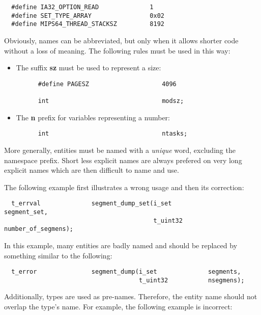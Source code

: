 \begin{verbatim}
  #define IA32_OPTION_READ              1
  #define SET_TYPE_ARRAY                0x02
  #define MIPS64_THREAD_STACKSZ         8192
\end{verbatim}

Obviously, names can be abbreviated, but only when it allows shorter code
without a loss of meaning. The following rules must be used in this way:

\begin{itemize}
  \item
    The suffix \textbf{sz} must be used to represent a size:

    \begin{verbatim}
      #define PAGESZ                    4096

      int                               modsz;
    \end{verbatim}
  \item
    The \textbf{n} prefix for variables representing a number:

    \begin{verbatim}
      int                               ntasks;
    \end{verbatim}
\end{itemize}

More generally, entities must be named with a \textit{unique} word,
excluding the namespace prefix. Short less explicit names are always prefered
on very long explicit names which are then difficult to name and use.

The following example first illustrates a wrong usage and then its correction:

\begin{verbatim}
  t_errval              segment_dump_set(i_set              segment_set,
                                         t_uint32           number_of_segmens);
\end{verbatim}

In this example, many entities are badly named and should be replaced by
something similar to the following:

\begin{verbatim}
  t_error               segment_dump(i_set              segments,
                                     t_uint32           nsegmens);
\end{verbatim}

Additionally, types are used as pre-names. Therefore, the entity name should
not overlap the type's name. For example, the following example is incorrect:

